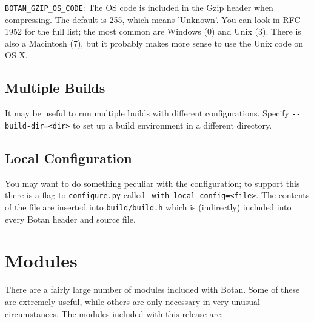 \documentclass{article}
\newcommand{\filename}[1]{\texttt{#1}}
\newcommand{\macro}[1]{\texttt{#1}}
\begin{document}
\macro{BOTAN\_GZIP\_OS\_CODE}: The OS code is included in the Gzip header when
compressing. The default is 255, which means 'Unknown'. You can look in RFC
1952 for the full list; the most common are Windows (0) and Unix (3). There is
also a Macintosh (7), but it probably makes more sense to use the Unix code on
OS X.

\subsection{Multiple Builds}

It may be useful to run multiple builds with different
configurations. Specify \verb|--build-dir=<dir>| to set up a build
environment in a different directory.

\subsection{Local Configuration}

You may want to do something peculiar with the configuration; to
support this there is a flag to \filename{configure.py} called
\texttt{--with-local-config=<file>}. The contents of the file are
inserted into \filename{build/build.h} which is (indirectly) included
into every Botan header and source file.

\pagebreak

\section{Modules}

There are a fairly large number of modules included with Botan. Some
of these are extremely useful, while others are only necessary in very
unusual circumstances. The modules included with this release are:

\newcommand{\mod}[2]{\textbf{#1}: #2}
\end{document}
